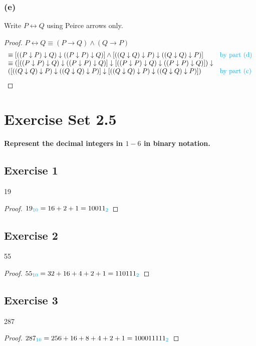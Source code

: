 \documentclass[14pt]{extarticle}
\newcommand{\bic}{\leftrightarrow}
\newcommand{\base}[1]{{\color{cyan}#1}}
\newcommand{\da}{\downarrow}
\begin{document}
\subsubsection{(e)}
Write $P \bic Q$ using Peirce arrows only.

\begin{proof}
$P \bic Q \equiv (P \to Q)\wedge(Q \to P)$
$$
\begin{array}{ll}
\equiv [((P \da P) \da Q) \da ((P \da P) \da Q)] \wedge [((Q \da Q) \da P) \da ((Q \da Q) \da P)] & \text{\color{cyan}by part (d)} \\
\equiv ([((P \da P) \da Q) \da ((P \da P) \da Q)] \da [((P \da P) \da Q) \da ((P \da P) \da Q)]) \da & \\ ([((Q \da Q) \da P) \da ((Q \da Q) \da P)] \da [((Q \da Q) \da P) \da ((Q \da
Q) \da P)]) & \text{\color{cyan}by part (c)} \\
\end{array}
$$
\end{proof}

\section{Exercise Set 2.5}
{\bf \color{cyan} Represent the decimal integers in $1-6$ in binary notation.}

\subsection{Exercise 1}
19

\begin{proof}
$19_\base{10} = 16 + 2 + 1 = 10011_\base{2}$
\end{proof}

\subsection{Exercise 2}
55

\begin{proof}
$55_\base{10} = 32 + 16 + 4 + 2 + 1 = 110111_\base{2}$
\end{proof}

\subsection{Exercise 3}
287

\begin{proof}
$287_\base{10} = 256 + 16 + 8 + 4 + 2 + 1 = 100011111_\base{2}$
\end{proof}
\end{document}
